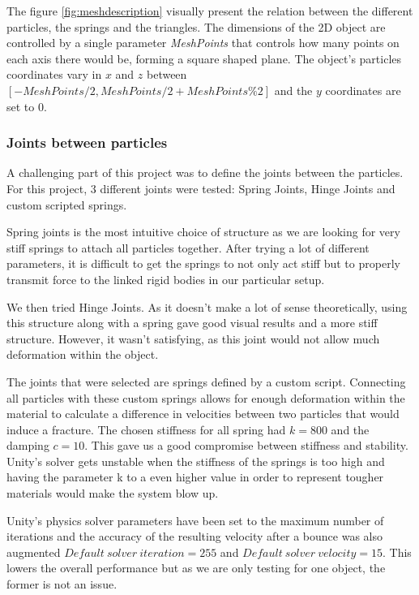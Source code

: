 \documentclass[tog]{acmsiggraph}
\begin{document}
The figure \ref{fig:meshdescription} visually present the relation between the different particles, the springs and the triangles. The dimensions of the 2D object are controlled by a single parameter \textit{MeshPoints} that controls how many points on each axis there would be, forming a square shaped plane. The object's particles coordinates vary in $x$ and $z$ between $[-MeshPoints/2, MeshPoints/2 + MeshPoints\% 2]$ and the $y$ coordinates are set to 0. 

\subsubsection{Joints between particles}
A challenging part of this project was to define the joints between the particles. For this project, 3 different joints were tested: Spring Joints, Hinge Joints and custom scripted springs. 

Spring joints is the most intuitive choice of structure as we are looking for very stiff springs to attach all particles together. After trying a lot of different parameters, it is difficult to get the springs to not only act stiff but to properly transmit force to the linked rigid bodies in our particular setup. 

We then tried Hinge Joints. As it doesn't make a lot of sense theoretically, using this structure along with a spring gave good visual results and a more stiff structure. However, it wasn't satisfying, as this joint would not allow much deformation within the object.

The joints that were selected are springs defined by a custom script. Connecting all particles with these custom springs allows for enough deformation within the material to calculate a difference in velocities between two particles that would induce a fracture. The chosen stiffness for all spring had $k = 800$ and the damping $c = 10$. This gave us a good compromise between stiffness and stability. Unity's solver gets unstable when the stiffness of the springs is too high and having the parameter k to a even higher value in order to represent tougher materials would make the system blow up. 

Unity's physics solver parameters have been set to the maximum number of iterations and the accuracy of the resulting velocity after a bounce was also augmented $Default\ solver\ iteration = 255$ and $Default\ solver\ velocity = 15$. This lowers the overall performance but as we are only testing for one object, the former is not an issue.
\end{document}

